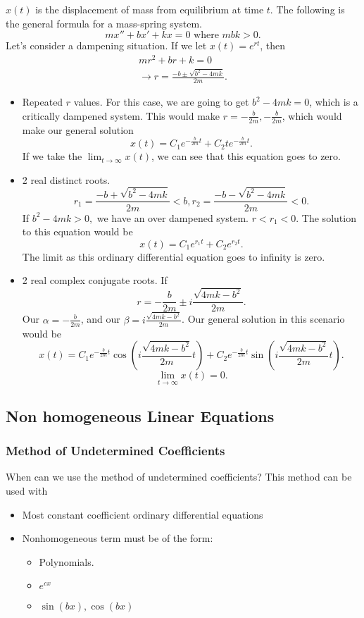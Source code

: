   $x(t)$ is the displacement of mass from equilibrium at time $t$. The following is the general formula for a mass-spring system.
  \[
    mx''+bx'+kx=0 \text{ where $mbk>0$}
  .\] 
  Let's consider a dampening situation. If we let $x(t)=e^{rt}$, then 
  \begin{align*}
  mr^2+br+k=0\\
  \to r=\frac{-b\pm\sqrt{b^2-4mk} }{2m}
  .\end{align*}
  \begin{itemize}
    \item Repeated $r$ values.
      For this case, we are going to get $b^2-4mk=0$, which is a critically dampened system. This would make $r=-\frac{b}{2m},-\frac{b}{2m}$, which would make our general solution 
      \[
        x(t)=C_1e^{-\frac{b}{2m}t}+C_2te^{-\frac{b}{2m}t}
      .\] 
      If we take the $\lim_{t \to \infty} x(t) $, we can see that this equation goes to zero.
    \item 2 real distinct roots.
      \[
        r_1=\frac{-b+\sqrt{b^2-4mk} }{2m}<b, r_2=\frac{-b-\sqrt{b^2-4mk} }{2m} <0 
      .\] 
      If $b^2-4mk > 0,$ we have an over dampened system. $r<r_1<0$. The solution to this equation would be 
      \[
        x(t)=C_1e^{r_1t}+C_2e^{r_2t}
      .\] 
      The limit as this ordinary differential equation goes to infinity is zero.
    \item 2 real complex conjugate roots. If 
      \[
      r=-\frac{b}{2m}\pm i \frac{\sqrt{4mk-b^2} }{2m}
      .\] 
      Our $\alpha = -\frac{b}{2m}$, and our $\beta=i \frac{\sqrt{4mk-b^2} }{2m}$. Our general solution in this scenario would be 
      \[
        x(t)=C_1e^{-\frac{b}{2m}t}\cos\left( i \frac{\sqrt{4mk-b^2} }{2m}t \right) +C_2e^{-\frac{b}{2m}t}\sin\left( i \frac{\sqrt{4mk-b^2} }{2m}t \right) 
      .\] 
      \[
        \lim_{t \to \infty} x(t)=0
      .\] 
  \end{itemize}
\subsection{Non homogeneous Linear Equations}

\subsubsection{Method of Undetermined Coefficients}

When can we use the method of undetermined coefficients? This method can be used with
\begin{itemize}
  \item Most constant coefficient ordinary differential equations
  \item Nonhomogeneous term must be of the form:
    \begin{itemize}
      \item Polynomials.
      \item $e^{cx}$
      \item $\sin(bx),\cos(bx)$
    \end{itemize}
\end{itemize}

